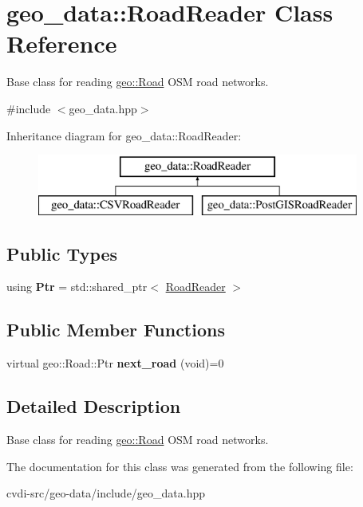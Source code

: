 \hypertarget{classgeo__data_1_1RoadReader}{}\section{geo\+\_\+data\+:\+:Road\+Reader Class Reference}
\label{classgeo__data_1_1RoadReader}


Base class for reading \hyperlink{classgeo_1_1Road}{geo\+::\+Road} O\+SM road networks.  




{\ttfamily \#include $<$geo\+\_\+data.\+hpp$>$}

Inheritance diagram for geo\+\_\+data\+:\+:Road\+Reader\+:\begin{figure}[H]
\begin{center}
\leavevmode
\includegraphics[height=2.000000cm]{classgeo__data_1_1RoadReader}
\end{center}
\end{figure}
\subsection*{Public Types}
\begin{DoxyCompactItemize}
\item 
using {\bfseries Ptr} = std\+::shared\+\_\+ptr$<$ \hyperlink{classgeo__data_1_1RoadReader}{Road\+Reader} $>$\hypertarget{classgeo__data_1_1RoadReader_a7f77731899e1a9d738bb07a7ee9bcceb}{}\label{classgeo__data_1_1RoadReader_a7f77731899e1a9d738bb07a7ee9bcceb}

\end{DoxyCompactItemize}
\subsection*{Public Member Functions}
\begin{DoxyCompactItemize}
\item 
virtual geo\+::\+Road\+::\+Ptr {\bfseries next\+\_\+road} (void)=0\hypertarget{classgeo__data_1_1RoadReader_a94d9bfa3df5ed6a7cfde3b765c5c330f}{}\label{classgeo__data_1_1RoadReader_a94d9bfa3df5ed6a7cfde3b765c5c330f}

\end{DoxyCompactItemize}


\subsection{Detailed Description}
Base class for reading \hyperlink{classgeo_1_1Road}{geo\+::\+Road} O\+SM road networks. 

The documentation for this class was generated from the following file\+:\begin{DoxyCompactItemize}
\item 
cvdi-\/src/geo-\/data/include/geo\+\_\+data.\+hpp\end{DoxyCompactItemize}
